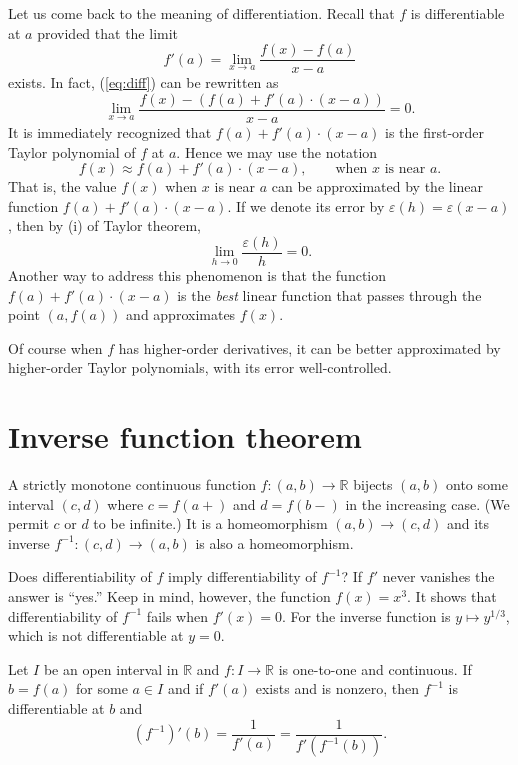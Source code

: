Let us come back to the meaning of differentiation.
Recall that $f$ is differentiable at $a$ provided that the limit
\begin{equation}
  \label{eq:diff}
  f'(a) = \lim_{x \to a} \frac{ f(x) - f(a) }{ x - a }
\end{equation}
exists.  In fact, (\ref{eq:diff}) can be rewritten as 
\[
  \lim_{x \to a} \frac{ f(x) - (f(a) + f'(a)\cdot(x-a)) }{x - a} = 0.
\]
It is immediately recognized that $f(a) + f'(a)\cdot(x-a)$ is the first-order Taylor polynomial of $f$ at $a$.
Hence we may use the notation
\[
  f(x) \approx f(a) + f'(a) \cdot (x-a), \qquad \text{when $x$ is near $a$}.
\]
That is, the value $f(x)$ when $x$ is near $a$ can be approximated by the linear function $f(a) + f'(a) \cdot (x-a)$.
If we denote its error by $\varepsilon(h) = \varepsilon(x-a)$, then by (i) of Taylor theorem,
\[
  \lim_{h \to 0} \frac{ \varepsilon(h) }{ h } = 0.
\]
Another way to address this phenomenon is that the function $f(a) + f'(a) \cdot (x-a)$ is the \textit{best} linear function that passes through the point $(a, f(a))$ and approximates $f(x)$.

Of course when $f$ has higher-order derivatives, it can be better approximated by higher-order Taylor polynomials, with its error well-controlled.

\section{Inverse function theorem}
\label{sec:IFT}

A strictly monotone continuous function $f : (a,b) \to \mathbb{R}$ bijects $(a,b)$ onto some interval $(c,d)$ where $c = f(a+)$ and $d = f(b-)$ in the increasing case.
(We permit $c$ or $d$ to be infinite.)
It is a homeomorphism $(a,b) \to (c,d)$ and its inverse $f^{-1} : (c,d) \to (a,b)$ is also a homeomorphism.

Does differentiability of $f$ imply differentiability of $f^{-1}$?
If $f'$ never vanishes the answer is ``yes.''
Keep in mind, however, the function $f(x) = x^3$.
It shows that differentiability of $f^{-1}$ fails when $f'(x) = 0$.
For the inverse function is $y \mapsto y^{1/3}$, which is not differentiable at $y = 0$.

\begin{thm}
  Let $I$ be an open interval in $\mathbb{R}$ and $f : I \to \mathbb{R}$ is one-to-one and continuous.
  If $b = f(a)$ for some $a \in I$ and if $f'(a)$ exists and is nonzero, then $f^{-1}$ is differentiable at $b$ and
  \[
    (f^{-1})'(b) = \frac{1}{f'(a)} = \frac{1}{f'(f^{-1}(b))}.
  \]
\end{thm}

